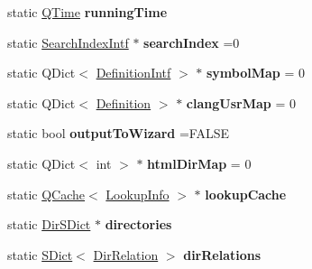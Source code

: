 \begin{DoxyCompactItemize}
\item 
\hypertarget{class_doxygen_ae57f90e261afb610d950f3a9662475d1}{static \hyperlink{class_q_time}{Q\-Time} {\bfseries running\-Time}}\label{class_doxygen_ae57f90e261afb610d950f3a9662475d1}

\item 
\hypertarget{class_doxygen_a954d5f4b08fa823d4d6ecf39507c1bc1}{static \hyperlink{class_search_index_intf}{Search\-Index\-Intf} $\ast$ {\bfseries search\-Index} =0}\label{class_doxygen_a954d5f4b08fa823d4d6ecf39507c1bc1}

\item 
\hypertarget{class_doxygen_a9de084c64420b57dd0f7e0a1041ebe4f}{static Q\-Dict$<$ \hyperlink{class_definition_intf}{Definition\-Intf} $>$ $\ast$ {\bfseries symbol\-Map} = 0}\label{class_doxygen_a9de084c64420b57dd0f7e0a1041ebe4f}

\item 
\hypertarget{class_doxygen_af190e79477bca2fd6063c0900a033201}{static Q\-Dict$<$ \hyperlink{class_definition}{Definition} $>$ $\ast$ {\bfseries clang\-Usr\-Map} = 0}\label{class_doxygen_af190e79477bca2fd6063c0900a033201}

\item 
\hypertarget{class_doxygen_a01f99782fdd3206f3b1d0d8e161ece23}{static bool {\bfseries output\-To\-Wizard} =F\-A\-L\-S\-E}\label{class_doxygen_a01f99782fdd3206f3b1d0d8e161ece23}

\item 
\hypertarget{class_doxygen_aa3daf2871d0a35796e21a6085bc08ce1}{static Q\-Dict$<$ int $>$ $\ast$ {\bfseries html\-Dir\-Map} = 0}\label{class_doxygen_aa3daf2871d0a35796e21a6085bc08ce1}

\item 
\hypertarget{class_doxygen_a4d96511abc81050928efff02b0ae688a}{static \hyperlink{class_q_cache}{Q\-Cache}$<$ \hyperlink{struct_lookup_info}{Lookup\-Info} $>$ $\ast$ {\bfseries lookup\-Cache}}\label{class_doxygen_a4d96511abc81050928efff02b0ae688a}

\item 
\hypertarget{class_doxygen_aaecb2a521795f9c7dc8f447308099477}{static \hyperlink{class_dir_s_dict}{Dir\-S\-Dict} $\ast$ {\bfseries directories}}\label{class_doxygen_aaecb2a521795f9c7dc8f447308099477}

\item 
\hypertarget{class_doxygen_a997d3ef6953e1a7a825f2c7c8d80b4f1}{static \hyperlink{class_s_dict}{S\-Dict}$<$ \hyperlink{class_dir_relation}{Dir\-Relation} $>$ {\bfseries dir\-Relations}}\label{class_doxygen_a997d3ef6953e1a7a825f2c7c8d80b4f1}


\end{DoxyCompactItemize}
